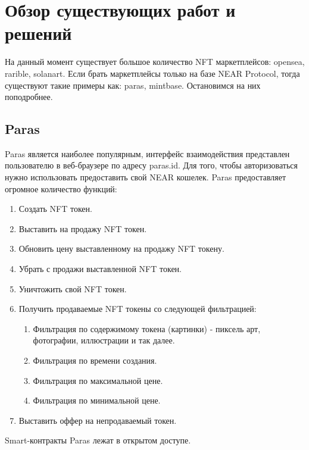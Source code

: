 \section{Обзор существующих работ и решений}
\label{section.theory}
На данный момент существует большое количество NFT маркетплейсов: opensea\cite{opensea}, rarible\cite{rarible}, solanart\cite{solanart}. Если брать маркетплейсы только на базе NEAR Protocol, тогда существуют такие примеры как: paras\cite{paras}, mintbase\cite{mintbase}. Остановимся на них поподробнее.

\subsection{Paras}
\label{section.theory.paras}

Paras является наиболее популярным, интерфейс взаимодействия представлен пользователю в веб-браузере по адресу paras.id. Для того, чтобы авторизоваться нужно использовать
предоставить свой NEAR кошелек. Paras предоставляет огромное количество функций:
\begin{enumerate}
    \item Создать NFT токен.
    \item Выставить на продажу NFT токен.
    \item Обновить цену выставленному на продажу NFT токену.
    \item Убрать с продажи выставленной NFT токен.
    \item Уничтожить свой NFT токен.
    \item Получить продаваемые NFT токены со следующей фильтрацией:
        \begin{enumerate}
            \item Фильтрация по содержимому токена (картинки) - пиксель арт, фотографии, иллюстрации и так далее.
            \item Фильтрация по времени создания.
            \item Фильтрация по максимальной цене.
            \item Фильтрация по минимальной цене.
        \end{enumerate}
    \item Выставить оффер на непродаваемый токен.
\end{enumerate}

Smart-контракты Paras лежат в открытом доступе\cite{parasnftcontract, parasmarketplacecontract}.

